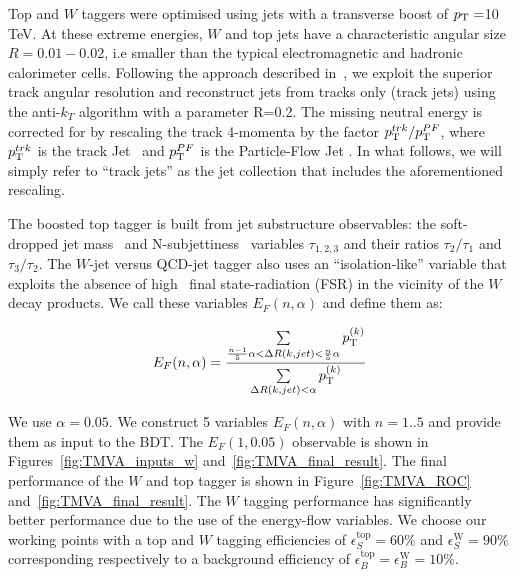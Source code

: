 \documentclass{cernrep}
\begin{document}
Top and $W$ taggers were optimised using jets with a transverse boost of $p_{\text{T}}=$10 TeV. At these extreme energies, $W$ and top jets have a characteristic angular size $R=0.01-0.02$, i.e smaller than the typical electromagnetic and hadronic calorimeter cells. Following the approach described in~\cite{Larkoski:2015yqa}, we exploit the superior track angular resolution and reconstruct jets from tracks only (track jets) using the anti-$k_T$ algorithm with a parameter R=0.2. The missing neutral energy is corrected for by rescaling the track 4-momenta by the factor $p_{\text{T}}^{trk}/p_{\text{T}}^{PF}$, where $p_{\text{T}}^{trk}$ is the track Jet \pt\ and $p_{\text{T}}^{PF}$ is the Particle-Flow Jet \pT. In what follows, we will simply refer to ``track jets'' as the jet collection that includes the aforementioned rescaling.

The boosted top tagger is built from jet substructure observables: the soft-dropped jet mass~\cite{Larkoski:2014wba} and N-subjettiness~\cite{Thaler:2010tr} variables $\tau_{1,2,3}$ and their ratios $\tau_{2}/\tau_{1}$ and $\tau_{3}/\tau_{2}$. The $W$-jet versus QCD-jet tagger also uses an ``isolation-like'' variable that exploits the absence of high \pt\ final state-radiation (FSR) in the vicinity of the $W$ decay products. We call these variables $E_{F}(n,\alpha)$ and define them as:

\begin{equation}
E_{F}(n,\alpha) =  \frac{\sum \limits_{\frac{n-1}{5}\alpha < \Delta R(k,jet)< \frac{n}{5}\alpha} p_{\text{T}}^{(k)}}{\sum \limits_{\Delta R(k,jet)< \alpha} p_{\text{T}}^{(k)}}
\end{equation}

We use $\alpha=0.05$. We construct 5 variables $E_{F}(n,\alpha)$ with $n=1..5$ and provide them as input to the BDT. The $E_{F}(1,0.05)$ observable is shown in 
Figures~\ref{fig:TMVA_inputs_w} and~\ref{fig:TMVA_final_result}.
The final performance of the $W$ and top tagger is shown in Figure~\ref{fig:TMVA_ROC} and~\ref{fig:TMVA_final_result}.
The $W$ tagging performance has significantly better performance due to the use of the energy-flow variables. We choose our working points with a top and $W$ tagging efficiencies of $\epsilon_S^{\text{top}}=60\%$ and $\epsilon_S^{\text{W}}=90\%$ corresponding respectively to a background efficiency of $\epsilon_B^{\text{top}}=\epsilon_B^{\text{W}}=10\%$.
\end{document}
